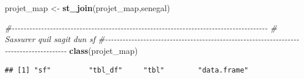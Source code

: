 \documentclass[
]{article}
\newenvironment{Shaded}{\begin{snugshade}}{\end{snugshade}}
\newcommand{\CommentTok}[1]{\textcolor[rgb]{0.56,0.35,0.01}{\textit{#1}}}
\newcommand{\FunctionTok}[1]{\textcolor[rgb]{0.13,0.29,0.53}{\textbf{#1}}}
\newcommand{\NormalTok}[1]{#1}
\newcommand{\OtherTok}[1]{\textcolor[rgb]{0.56,0.35,0.01}{#1}}
\begin{document}
\begin{Shaded}
\begin{Highlighting}[]
\NormalTok{projet\_map }\OtherTok{\textless{}{-}} \FunctionTok{st\_join}\NormalTok{(projet\_map,senegal)}

\CommentTok{\#{-}{-}{-}{-}{-}{-}{-}{-}{-}{-}{-}{-}{-}{-}{-}{-}{-}{-}{-}{-}{-}{-}{-}{-}{-}{-}{-}{-}{-}{-}{-}{-}{-}{-}{-}{-}{-}{-}{-}{-}{-}{-}{-}{-}{-}{-}{-}{-}{-}{-}{-}{-}{-}{-}{-}{-}{-}{-}{-}{-}{-}{-}{-}{-}{-}{-}{-}{-}{-}{-}{-}{-}{-}{-}{-}{-}{-}{-}{-}{-}{-}{-}{-}{-}{-}{-}{-}}
\CommentTok{\#             S\textquotesingle{}assurer qu\textquotesingle{}il s\textquotesingle{}agit d\textquotesingle{}un sf}
\CommentTok{\#{-}{-}{-}{-}{-}{-}{-}{-}{-}{-}{-}{-}{-}{-}{-}{-}{-}{-}{-}{-}{-}{-}{-}{-}{-}{-}{-}{-}{-}{-}{-}{-}{-}{-}{-}{-}{-}{-}{-}{-}{-}{-}{-}{-}{-}{-}{-}{-}{-}{-}{-}{-}{-}{-}{-}{-}{-}{-}{-}{-}{-}{-}{-}{-}{-}{-}{-}{-}{-}{-}{-}{-}{-}{-}{-}{-}{-}{-}{-}{-}{-}{-}{-}{-}{-}{-}{-}}
\FunctionTok{class}\NormalTok{(projet\_map)}
\end{Highlighting}
\end{Shaded}

\begin{verbatim}
## [1] "sf"         "tbl_df"     "tbl"        "data.frame"
\end{verbatim}
\end{document}
